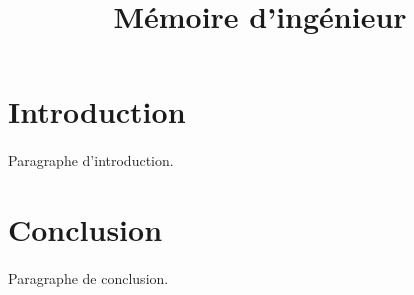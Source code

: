 \documentclass[a4paper, 12pt]{article}
\title{Mémoire d'ingénieur}
\newcommand{\comment}[1]{}
\begin{document}
	
	\comment{
	Penser à faire la page de garde.
	Rythm à tenir : 1 page / heure.
	Trouver comment compiler le mémoire depuis éclipse.
	}
	
	\maketitle
	  
	\section*{Introduction}
		\paragraph{}
		Paragraphe d'introduction.
	
	\comment{
	Corps du mémoire
	}
	
	
	
	
	\section*{Conclusion}
		\paragraph{}
		Paragraphe de conclusion.
\end{document}

